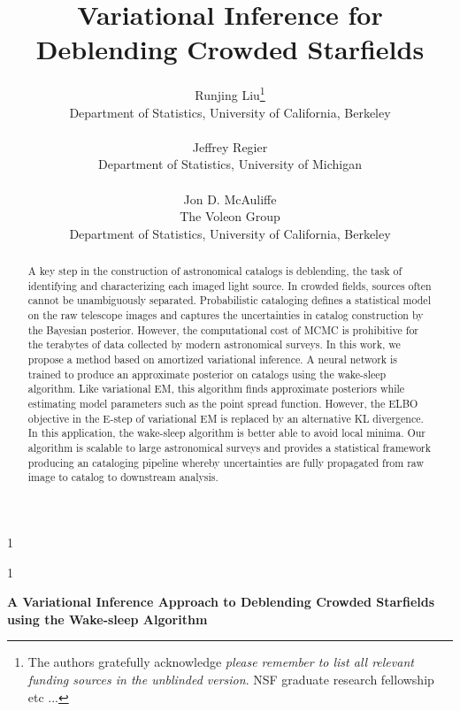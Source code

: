 \documentclass[12pt]{article}
\newcommand{\blind}{1}
\begin{document}
%

\def\spacingset#1{\renewcommand{\baselinestretch}%
{#1}\small\normalsize} \spacingset{1}


\blind
{
  \title{\bf Variational Inference for Deblending Crowded Starfields}
  \author{Runjing Liu\thanks{
    The authors gratefully acknowledge \textit{please remember to list all relevant funding sources in the unblinded version}. NSF graduate research fellowship etc ... }\hspace{.2cm}\\
    Department of Statistics, University of California, Berkeley\\
    \\
    Jeffrey Regier \\
    Department of Statistics, University of Michigan\\
    \\
    Jon D. McAuliffe \\
    The Voleon Group \\
    Department of Statistics, University of California, Berkeley}
  \maketitle
} \fi

\blind
{
  \bigskip
  \bigskip
  \bigskip
  \begin{center}
    {\LARGE\bf A Variational Inference Approach to Deblending Crowded Starfields using the Wake-sleep Algorithm}
\end{center}
  \medskip
} \fi

\bigskip
\begin{abstract}
A key step in the construction of astronomical catalogs is deblending, the task of identifying and characterizing each imaged light source.
In crowded fields, sources often cannot be unambiguously separated. 
Probabilistic cataloging defines a statistical model
on the raw telescope images and captures the uncertainties in catalog construction by the Bayesian posterior.
However, the computational cost of MCMC is prohibitive for the terabytes of data collected by modern astronomical surveys. 
In this work, we propose a method based on amortized variational inference.
A neural network is trained to produce an approximate posterior on catalogs using the wake-sleep algorithm. 
Like variational EM, this algorithm finds approximate posteriors while estimating model parameters such as the point spread function. 
However, the ELBO objective in the E-step of variational EM is replaced by an alternative KL divergence.
In this application, the wake-sleep algorithm is better able to avoid local minima. 
Our algorithm is scalable to large astronomical surveys and provides a statistical framework producing an cataloging pipeline whereby uncertainties are fully propagated from raw image to catalog to downstream analysis. 

\end{abstract}
\end{document}
